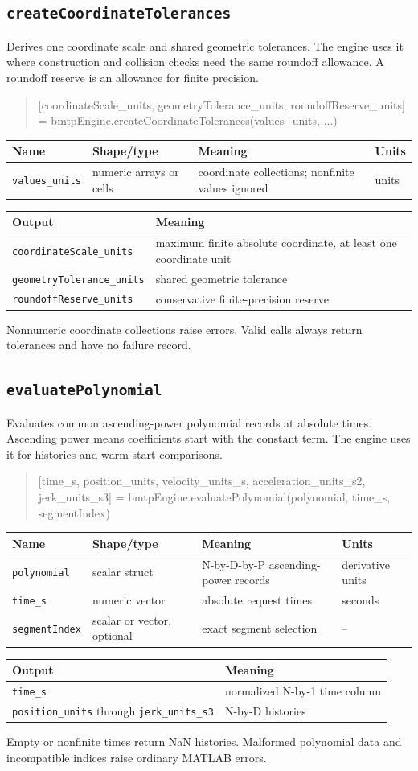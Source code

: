 \documentclass[11pt]{article}
\makeatletter
\newcommand{\iface}[5]{#1\par\begin{quote}\small\ttfamily\raggedright #2\par\end{quote}
\begin{tabularx}{\textwidth}{@{}p{.24\textwidth}p{.21\textwidth}Xp{.12\textwidth}@{}}\toprule Name & Shape/type & Meaning & Units \\\midrule #3\\\bottomrule\end{tabularx}
\begin{tabularx}{\textwidth}{@{}p{.30\textwidth}X@{}}\toprule Output & Meaning \\\midrule #4\\\bottomrule\end{tabularx}
\begingroup\sloppy #5\par\endgroup\medskip}
\makeatother
\begin{document}
\subsection{\texttt{createCoordinateTolerances}}
\iface{Derives one coordinate scale and shared geometric tolerances. The engine
uses it where construction and collision checks need the same roundoff
allowance. A roundoff reserve is an allowance for finite precision.}
{[coordinateScale\_units, geometryTolerance\_units, roundoffReserve\_units]
=\allowbreak{} bmtpEngine.createCoordinateTolerances(values\_units,\allowbreak{} ...)}
{\texttt{values\_units} & numeric arrays or cells & coordinate collections; nonfinite values ignored & units}
{\texttt{coordinateScale\_units} & maximum finite absolute coordinate, at least one coordinate unit \\
\texttt{geometryTolerance\_units} & shared geometric tolerance \\
\texttt{roundoffReserve\_units} & conservative finite-precision reserve}
{Nonnumeric coordinate collections raise errors. Valid calls always return
tolerances and have no failure record.}

\subsection{\texttt{evaluatePolynomial}}
\iface{Evaluates common ascending-power polynomial records at absolute times.
Ascending power means coefficients start with the constant term. The engine
uses it for histories and warm-start comparisons.}
{[time\_s, position\_units, velocity\_units\_s, acceleration\_units\_s2,
jerk\_units\_s3] =\allowbreak{} bmtpEngine.evaluatePolynomial(polynomial,\allowbreak{}
time\_s,\allowbreak{} segmentIndex)}
{\texttt{polynomial} & scalar struct & N-by-D-by-P ascending-power records & derivative units \\
\texttt{time\_s} & numeric vector & absolute request times & seconds \\
\texttt{segmentIndex} & scalar or vector, optional & exact segment selection & --}
{\texttt{time\_s} & normalized N-by-1 time column \\
\texttt{position\_units} through \texttt{jerk\_units\_s3} & N-by-D histories}
{Empty or nonfinite times return NaN histories. Malformed polynomial data and
incompatible indices raise ordinary MATLAB errors.}
\end{document}
